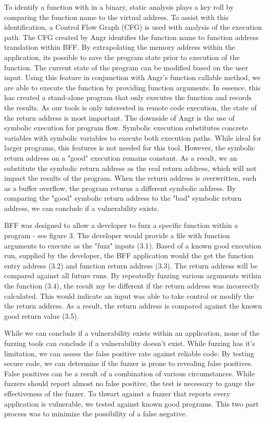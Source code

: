 \documentclass[conference]{IEEEtran}
\begin{document}
To identify a function with in a binary, static analysis plays a key roll by comparing the function name to the virtual address. To assist with this identification, a Control Flow Graph (CFG) is used with analysis of the execution path. The CFG created by Angr identifies the function name to function address translation within BFF. By extrapolating the memory address within the application, its possible to save the program state prior to execution of the function. The current state of the program can be modified based on the user input. Using this  feature in conjunction with Angr's function callable method, we are able to execute the function by providing function arguments. In essence, this has created a stand-alone program that only executes the function and records the results. As our  tools is only interested in remote code execution, the state of the return address is most important. The downside of Angr is the use of symbolic execution for program flow. Symbolic execution substitutes concrete variables with symbolic variables to execute both execution paths. While ideal for larger programs, this features is not needed for this tool. However, the symbolic return address on a "good" execution remains constant. As a result, we an substitute the symbolic return address as the real return address, which will not impact the results of the program. When the return address is overwritten, such as a buffer overflow, the program returns a different symbolic address. By comparing the "good" symbolic return address to the "bad" symbolic return address, we can conclude if a vulnerability exists.

BFF was designed to allow a developer to fuzz a specific function within a program - see figure 3. The developer would provide a file with function arguments to execute as the "fuzz" inputs (3.1). Based of a known good execution run, supplied by the developer, the BFF application would the get the function entry address (3.2) and function return address (3.3). The return address will be compared against all future runs. By repeatedly fuzzing various arguments within the function (3.4), the result my be different if the return address was incorrectly calculated. This would indicate an input was able to take control or modify the the return address. As a result, the return address is compared against the known good return value (3.5).  

While we can conclude if a vulnerability exists within an application, none of the fuzzing tools can conclude if a vulnerability doesn't exist. While fuzzing has it's limitation, we can assess the false positive rate against reliable code. By testing secure code, we can determine if the fuzzer is prone to revealing false positives. False positives can be a result of a combination of various circumstances. While fuzzers should report almost no false positive, the test is necessary to gauge the effectiveness of the fuzzer. To thwart against a fuzzer that reports every application is vulnerable, we tested against known good programs. This two part process was to minimize the possibility of a false negative. 
\end{document}
